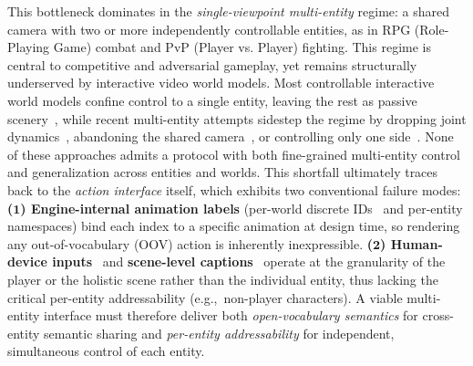 This bottleneck dominates in the \emph{single-viewpoint multi-entity} regime: 
a shared camera with two or more independently controllable entities, 
as in RPG (Role-Playing Game) combat and PvP (Player vs. Player) fighting.
This regime is central to competitive and adversarial gameplay, yet remains 
structurally underserved by interactive video world models.
Most controllable interactive world models confine control to a single entity,
leaving the rest as passive scenery~\citep{bruce2024genie, oasis2024, he2025matrixgame2, 
guo2025mineworld}, 
while recent 
multi-entity attempts sidestep the regime by dropping joint dynamics~\citep{po2026multigen}, 
abandoning the shared camera~\citep{solaris2025}, 
or controlling only one side~\citep{agarwal2026combat}.
None of these approaches admits a protocol with both fine-grained multi-entity control
and generalization across entities and worlds.
This shortfall ultimately traces back to the \emph{action interface} itself, 
which exhibits two conventional failure modes: 
\textbf{($\mathbf{1}$) Engine-internal animation labels} 
(per-world discrete IDs~\citep{alonso2024diffusion} and per-entity namespaces) 
bind each index to a specific animation at design time, 
so rendering any out-of-vocabulary (OOV) action is inherently inexpressible.
\textbf{($\mathbf{2}$) Human-device inputs}~\citep{bruce2024genie, parkerholder2024genie2,parkerholder2025genie3, oasis2024, he2025matrixgame2, guo2025mineworld,yu2025gamefactory, valevski2024diffusion} and 
\textbf{scene-level captions}~\citep{che2024gamegenx, tang2025hunyuan, team2026advancing} 
operate at the granularity of the player or the holistic scene rather than the individual entity,
thus lacking the critical per-entity addressability (e.g.,~non-player characters).
A viable multi-entity interface must therefore deliver both \emph{open-vocabulary semantics} 
for cross-entity semantic sharing and \emph{per-entity addressability} 
for independent, simultaneous control of each entity.
